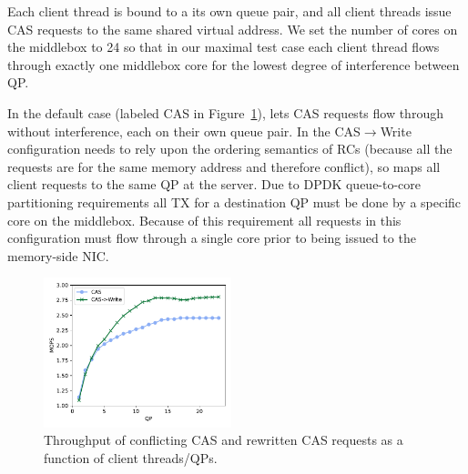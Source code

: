 Each client thread is bound to a its own queue pair, and all client
threads issue CAS requests to the same shared virtual address.  We
set the number of cores on the {\sword} middlebox to 24 so that in our maximal
test case each client thread flows through exactly one middlebox core
for the lowest degree of interference between QP.

In the default case (labeled CAS in Figure~\ref{fig:cas_vs_swap}),
{\sword} lets CAS requests flow through without interference, each
on their own queue pair.  In the CAS$\rightarrow$Write configuration
{\sword} needs to rely upon the ordering semantics of RCs (because all
the requests are for the same memory address and therefore
conflict), so maps all client requests to the same QP at the server.
Due to DPDK queue-to-core partitioning requirements all TX for a
destination QP must be done by a specific core on the
middlebox. Because of this requirement all requests in this
configuration must flow through a single core prior to being issued to
the memory-side NIC.


\begin{figure}[t]
    \includegraphics[width=0.485\textwidth]{fig/cas_vs_swap.pdf}
    \caption{Throughput of conflicting CAS and rewritten CAS requests as a function of client threads/QPs.}
    \label{fig:cas_vs_swap}
\end{figure}


